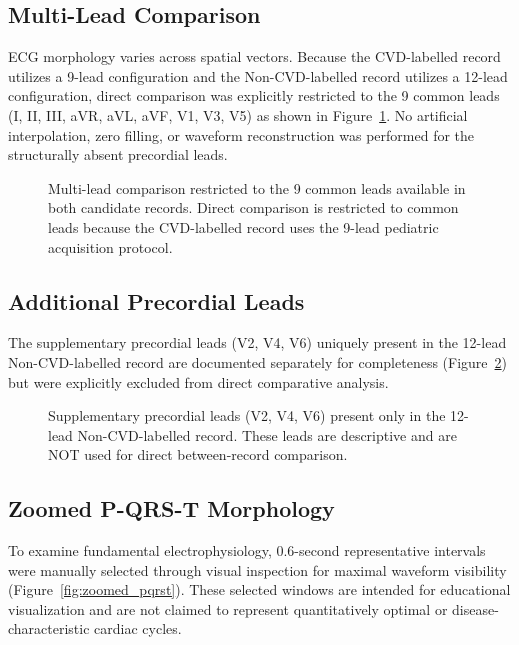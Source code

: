 \documentclass[11pt, a4paper]{article}
\begin{document}
\subsection{Multi-Lead Comparison}
ECG morphology varies across spatial vectors. Because the CVD-labelled record utilizes a 9-lead configuration and the Non-CVD-labelled record utilizes a 12-lead configuration, direct comparison was explicitly restricted to the 9 common leads (I, II, III, aVR, aVL, aVF, V1, V3, V5) as shown in Figure~\ref{fig:multilead_comparison}. No artificial interpolation, zero filling, or waveform reconstruction was performed for the structurally absent precordial leads.

\begin{figure}[htbp]
    \centering
    \caption{Multi-lead comparison restricted to the 9 common leads available in both candidate records. Direct comparison is restricted to common leads because the CVD-labelled record uses the 9-lead pediatric acquisition protocol.}
    \label{fig:multilead_comparison}
\end{figure}

\subsection{Additional Precordial Leads}
The supplementary precordial leads (V2, V4, V6) uniquely present in the 12-lead Non-CVD-labelled record are documented separately for completeness (Figure~\ref{fig:extra_leads}) but were explicitly excluded from direct comparative analysis.

\begin{figure}[htbp]
    \centering
    \caption{Supplementary precordial leads (V2, V4, V6) present only in the 12-lead Non-CVD-labelled record. These leads are descriptive and are NOT used for direct between-record comparison.}
    \label{fig:extra_leads}
\end{figure}

\subsection{Zoomed P-QRS-T Morphology}
To examine fundamental electrophysiology, 0.6-second representative intervals were manually selected through visual inspection for maximal waveform visibility (Figure~\ref{fig:zoomed_pqrst}). These selected windows are intended for educational visualization and are not claimed to represent quantitatively optimal or disease-characteristic cardiac cycles.
\end{document}
